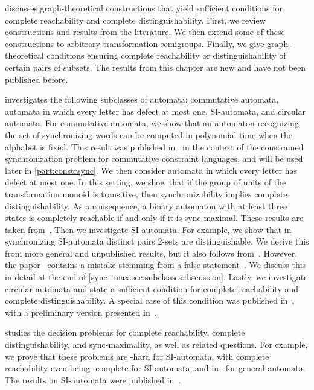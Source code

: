  discusses graph-theoretical constructions that yield sufficient conditions for complete reachability and complete distinguishability. First, we review constructions and results from the literature. We then extend some of these constructions to arbitrary transformation semigroups. Finally, we give graph-theoretical conditions ensuring complete reachability or distinguishability of certain pairs of subsets. The results from this chapter are new and have not been published before.

 investigates the following subclasses of automata: commutative automata, automata in which every letter has defect at most one, SI-automata, and circular automata.
For commutative automata, we show that an automaton recognizing the set of synchronizing words can be computed in polynomial time when the alphabet is fixed. This result was published in~\cite{DBLP:journals/tcs/Hoffmann21} in the context of the constrained synchronization problem for commutative constraint languages, and will be used later in \cref{part:constrsync}.
We then consider automata in which every letter has defect at most one. In this setting, we show that if the group of units of the transformation monoid is transitive, then synchronizability implies complete distinguishability. As a consequence, a binary automaton with at least three states is completely reachable if and only if it is sync-maximal. These results are taken from~\cite{Hoffmann2024}.
Then we investigate SI-automata. For example,
we show that in synchronizing SI-automata
distinct pairs $2$-sets are distinguishable.
We derive this from more general and unpublished results,
but it also follows from~\cite[Lem.~11]{DBLP:conf/dcfs/Hoffmann22}.
However, the paper~\cite{DBLP:conf/dcfs/Hoffmann22} 
contains a mistake stemming from a false statement~\cite[Prop.~2]{DBLP:conf/dcfs/Hoffmann22}.
We discuss this in detail at the end of \cref{sync_max:sec:subclasses:discussion}.
Lastly, we investigate circular automata and state a sufficient condition for complete reachability and complete distinguishability. A special case of this condition was published in~\cite{HoffmannCircularExtended}, with a preliminary version presented in~\cite{DBLP:conf/lata/Hoffmann21a}.

 studies the decision problems for complete reachability, complete distinguishability, and sync-maximality, as well as related questions.
For example, we prove that these problems 
are \NL-hard for SI-automata, with complete reachability even being \NL-complete for SI-automata,
and in \PSPACE\ for general automata.
The results on SI-automata were published in~\cite{DBLP:conf/dlt/Hoffmann23,Hoffmann2024}.

